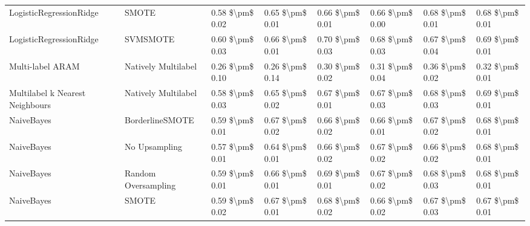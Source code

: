 \begin{tabular}{llllllll}
        LogisticRegressionRidge &                         SMOTE & 0.58 \$\textbackslash pm\$ 0.02 &           0.65 \$\textbackslash pm\$ 0.01 &       0.66 \$\textbackslash pm\$ 0.01 &        0.66 \$\textbackslash pm\$ 0.00 &                         0.68 \$\textbackslash pm\$ 0.01 &     0.68 \$\textbackslash pm\$ 0.01 \\
        LogisticRegressionRidge &                      SVMSMOTE & 0.60 \$\textbackslash pm\$ 0.03 &           0.66 \$\textbackslash pm\$ 0.01 &       0.70 \$\textbackslash pm\$ 0.03 &        0.68 \$\textbackslash pm\$ 0.03 &                         0.67 \$\textbackslash pm\$ 0.04 &     0.69 \$\textbackslash pm\$ 0.01 \\
               Multi-label ARAM &           Natively Multilabel & 0.26 \$\textbackslash pm\$ 0.10 &           0.26 \$\textbackslash pm\$ 0.14 &       0.30 \$\textbackslash pm\$ 0.02 &        0.31 \$\textbackslash pm\$ 0.04 &                         0.36 \$\textbackslash pm\$ 0.02 &     0.32 \$\textbackslash pm\$ 0.01 \\
Multilabel k Nearest Neighbours &           Natively Multilabel & 0.58 \$\textbackslash pm\$ 0.03 &           0.65 \$\textbackslash pm\$ 0.02 &       0.67 \$\textbackslash pm\$ 0.01 &        0.67 \$\textbackslash pm\$ 0.03 &                         0.68 \$\textbackslash pm\$ 0.03 &     0.69 \$\textbackslash pm\$ 0.01 \\
                     NaiveBayes &               BorderlineSMOTE & 0.59 \$\textbackslash pm\$ 0.01 &           0.67 \$\textbackslash pm\$ 0.02 &       0.66 \$\textbackslash pm\$ 0.02 &        0.66 \$\textbackslash pm\$ 0.01 &                         0.67 \$\textbackslash pm\$ 0.02 &     0.68 \$\textbackslash pm\$ 0.01 \\
                     NaiveBayes &                 No Upsampling & 0.57 \$\textbackslash pm\$ 0.01 &           0.64 \$\textbackslash pm\$ 0.01 &       0.66 \$\textbackslash pm\$ 0.02 &        0.67 \$\textbackslash pm\$ 0.02 &                         0.66 \$\textbackslash pm\$ 0.02 &     0.68 \$\textbackslash pm\$ 0.01 \\
                     NaiveBayes &           Random Oversampling & 0.59 \$\textbackslash pm\$ 0.01 &           0.66 \$\textbackslash pm\$ 0.01 &       0.69 \$\textbackslash pm\$ 0.01 &        0.67 \$\textbackslash pm\$ 0.02 &                         0.68 \$\textbackslash pm\$ 0.03 &     0.68 \$\textbackslash pm\$ 0.01 \\
                     NaiveBayes &                         SMOTE & 0.59 \$\textbackslash pm\$ 0.02 &           0.67 \$\textbackslash pm\$ 0.01 &       0.68 \$\textbackslash pm\$ 0.02 &        0.66 \$\textbackslash pm\$ 0.02 &                         0.67 \$\textbackslash pm\$ 0.03 &     0.67 \$\textbackslash pm\$ 0.01 \\

\end{tabular}

